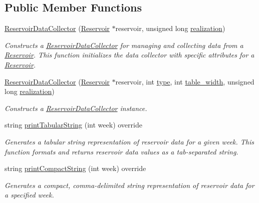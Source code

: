 \subsection*{Public Member Functions}
\begin{DoxyCompactItemize}
\item 
\mbox{\hyperlink{classReservoirDataCollector_a7647adce7b2d7a8598ae678a5015dde5}{Reservoir\+Data\+Collector}} (\mbox{\hyperlink{classReservoir}{Reservoir}} $\ast$reservoir, unsigned long \mbox{\hyperlink{classDataCollector_a9ef2887466fe3123aa19ef956a219b96}{realization}})
\begin{DoxyCompactList}\small\item\em Constructs a \mbox{\hyperlink{classReservoirDataCollector}{Reservoir\+Data\+Collector}} for managing and collecting data from a \mbox{\hyperlink{classReservoir}{Reservoir}}. This function initializes the data collector with specific attributes for a \mbox{\hyperlink{classReservoir}{Reservoir}}. \end{DoxyCompactList}\item 
\mbox{\hyperlink{classReservoirDataCollector_aaca132902fa717e71a0b0d5d5078c04c}{Reservoir\+Data\+Collector}} (\mbox{\hyperlink{classReservoir}{Reservoir}} $\ast$reservoir, int \mbox{\hyperlink{classDataCollector_acad1c22d67a8eb3db056ba776a131900}{type}}, int \mbox{\hyperlink{classDataCollector_af46c27a47de92d92dcdae6b26a905a44}{table\+\_\+width}}, unsigned long \mbox{\hyperlink{classDataCollector_a9ef2887466fe3123aa19ef956a219b96}{realization}})
\begin{DoxyCompactList}\small\item\em Constructs a \mbox{\hyperlink{classReservoirDataCollector}{Reservoir\+Data\+Collector}} instance. \end{DoxyCompactList}\item 
string \mbox{\hyperlink{classReservoirDataCollector_a81777b029bf26be403b9f4d67f01588b}{print\+Tabular\+String}} (int week) override
\begin{DoxyCompactList}\small\item\em Generates a tabular string representation of reservoir data for a given week. This function formats and returns reservoir data values as a tab-\/separated string. \end{DoxyCompactList}\item 
string \mbox{\hyperlink{classReservoirDataCollector_a0b68d7fa4a6d704350340d1ac3e8a1d2}{print\+Compact\+String}} (int week) override
\begin{DoxyCompactList}\small\item\em Generates a compact, comma-\/delimited string representation of reservoir data for a specified week. \end{DoxyCompactList}\item 

\end{DoxyCompactItemize}
